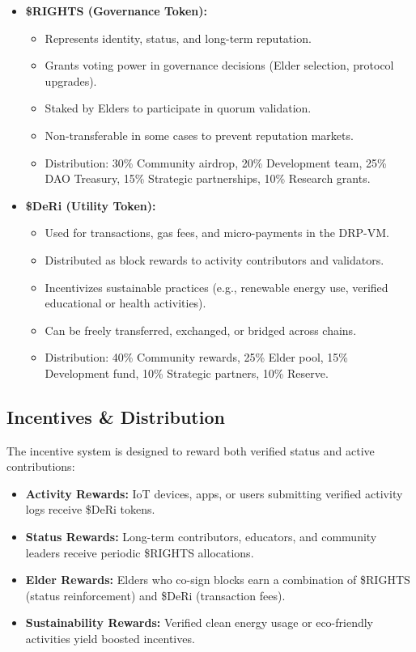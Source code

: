 \documentclass[11pt,a4paper]{article}
\begin{document}
\begin{itemize}
    \item \textbf{\$RIGHTS (Governance Token):}
    \begin{itemize}
        \item Represents identity, status, and long-term reputation.
        \item Grants voting power in governance decisions (Elder selection, protocol upgrades).
        \item Staked by Elders to participate in quorum validation.
        \item Non-transferable in some cases to prevent reputation markets.
        \item Distribution: 30\% Community airdrop, 20\% Development team, 25\% DAO Treasury, 15\% Strategic partnerships, 10\% Research grants.
    \end{itemize}

    \item \textbf{\$DeRi (Utility Token):}
    \begin{itemize}
        \item Used for transactions, gas fees, and micro-payments in the DRP-VM.
        \item Distributed as block rewards to activity contributors and validators.
        \item Incentivizes sustainable practices (e.g., renewable energy use, verified educational or health activities).
        \item Can be freely transferred, exchanged, or bridged across chains.
        \item Distribution: 40\% Community rewards, 25\% Elder pool, 15\% Development fund, 10\% Strategic partners, 10\% Reserve.
    \end{itemize}
\end{itemize}

\subsection{Incentives \& Distribution}
The incentive system is designed to reward both verified status and active contributions:

\begin{itemize}
    \item \textbf{Activity Rewards:} IoT devices, apps, or users submitting verified activity logs receive \$DeRi tokens.
    \item \textbf{Status Rewards:} Long-term contributors, educators, and community leaders receive periodic \$RIGHTS allocations.
    \item \textbf{Elder Rewards:} Elders who co-sign blocks earn a combination of \$RIGHTS (status reinforcement) and \$DeRi (transaction fees).
    \item \textbf{Sustainability Rewards:} Verified clean energy usage or eco-friendly activities yield boosted incentives.
\end{itemize}
\end{document}
